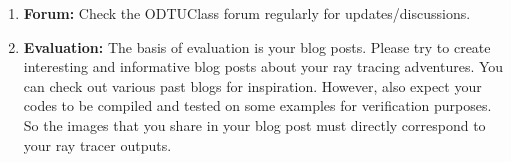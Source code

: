 \documentclass[12pt]{article}
\begin{document}
\begin{enumerate}
\item \textbf{Forum:} Check the ODTUClass forum regularly for
updates/discussions.

\item \textbf{Evaluation:} The basis of evaluation is your blog posts.
Please try to create interesting and informative blog posts about your
ray tracing adventures. You can check out various past blogs for
inspiration. However, also expect your codes to be compiled and tested
on some examples for verification purposes. So the images that you share
in your blog post must directly correspond to your ray tracer outputs.

\end{enumerate}



\end{document}
